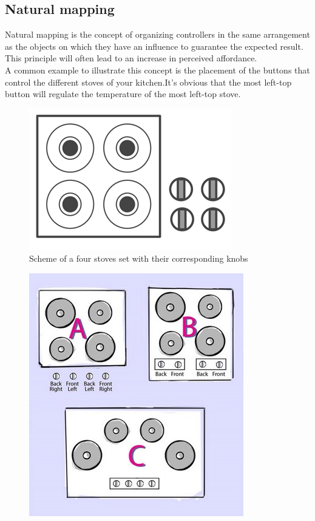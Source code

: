 \documentclass[a4paper,11pt] {article}
\theoremstyle{definition}
\begin{document}
\subsection{Natural mapping}
Natural mapping is the concept of organizing controllers in the same arrangement as the objects on which they have an influence to guarantee the expected result. This principle will often lead to an increase in perceived affordance.\\

A common example to illustrate this concept is the placement of the buttons that control the different stoves of your kitchen.It's obvious that the most left-top button will regulate the temperature of the most left-top stove.\\
 \begin{minipage}{\linewidth}
      \centering
      \begin{minipage}{0.45\linewidth}
          \begin{figure}[H]
          \centering
              \includegraphics[scale=0.3]{stove_natural.png}
              \caption{Scheme of a four stoves set with their corresponding knobs}
          \end{figure}
      \end{minipage}
      \hspace{0.05\linewidth}
      \begin{minipage}{0.45\linewidth}
          \begin{figure}[H]
                    \centering
              \includegraphics[scale=0.4]{NormanBurners.jpg}

\end{figure}
\end{minipage}
\end{minipage}
\end{document}
